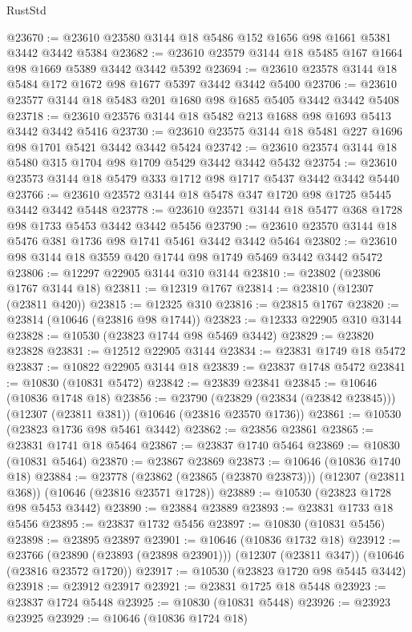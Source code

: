 \begin{lexlean}{RustStd}
\begin{coremodule}
@23670 := @23610 @23580 @3144 @18 @5486 @152 @1656 @98 @1661 @5381 @3442 @3442 @5384
@23682 := @23610 @23579 @3144 @18 @5485 @167 @1664 @98 @1669 @5389 @3442 @3442 @5392
@23694 := @23610 @23578 @3144 @18 @5484 @172 @1672 @98 @1677 @5397 @3442 @3442 @5400
@23706 := @23610 @23577 @3144 @18 @5483 @201 @1680 @98 @1685 @5405 @3442 @3442 @5408
@23718 := @23610 @23576 @3144 @18 @5482 @213 @1688 @98 @1693 @5413 @3442 @3442 @5416
@23730 := @23610 @23575 @3144 @18 @5481 @227 @1696 @98 @1701 @5421 @3442 @3442 @5424
@23742 := @23610 @23574 @3144 @18 @5480 @315 @1704 @98 @1709 @5429 @3442 @3442 @5432
@23754 := @23610 @23573 @3144 @18 @5479 @333 @1712 @98 @1717 @5437 @3442 @3442 @5440
@23766 := @23610 @23572 @3144 @18 @5478 @347 @1720 @98 @1725 @5445 @3442 @3442 @5448
@23778 := @23610 @23571 @3144 @18 @5477 @368 @1728 @98 @1733 @5453 @3442 @3442 @5456
@23790 := @23610 @23570 @3144 @18 @5476 @381 @1736 @98 @1741 @5461 @3442 @3442 @5464
@23802 := @23610 @98 @3144 @18 @3559 @420 @1744 @98 @1749 @5469 @3442 @3442 @5472
@23806 := @12297 @22905 @3144 @310 @3144
@23810 := @23802 (@23806 @1767 @3144 @18)
@23811 := @12319 @1767
@23814 := @23810 (@12307 (@23811 @420))
@23815 := @12325 @310
@23816 := @23815 @1767
@23820 := @23814 (@10646 (@23816 @98 @1744))
@23823 := @12333 @22905 @310 @3144
@23828 := @10530 (@23823 @1744 @98 @5469 @3442)
@23829 := @23820 @23828
@23831 := @12512 @22905 @3144
@23834 := @23831 @1749 @18 @5472
@23837 := @10822 @22905 @3144 @18
@23839 := @23837 @1748 @5472
@23841 := @10830 (@10831 @5472)
@23842 := @23839 @23841
@23845 := @10646 (@10836 @1748 @18)
@23856 := @23790
    (@23829 (@23834 (@23842 @23845)))
    (@12307 (@23811 @381))
    (@10646 (@23816 @23570 @1736))
@23861 := @10530 (@23823 @1736 @98 @5461 @3442)
@23862 := @23856 @23861
@23865 := @23831 @1741 @18 @5464
@23867 := @23837 @1740 @5464
@23869 := @10830 (@10831 @5464)
@23870 := @23867 @23869
@23873 := @10646 (@10836 @1740 @18)
@23884 := @23778
    (@23862 (@23865 (@23870 @23873)))
    (@12307 (@23811 @368))
    (@10646 (@23816 @23571 @1728))
@23889 := @10530 (@23823 @1728 @98 @5453 @3442)
@23890 := @23884 @23889
@23893 := @23831 @1733 @18 @5456
@23895 := @23837 @1732 @5456
@23897 := @10830 (@10831 @5456)
@23898 := @23895 @23897
@23901 := @10646 (@10836 @1732 @18)
@23912 := @23766
    (@23890 (@23893 (@23898 @23901)))
    (@12307 (@23811 @347))
    (@10646 (@23816 @23572 @1720))
@23917 := @10530 (@23823 @1720 @98 @5445 @3442)
@23918 := @23912 @23917
@23921 := @23831 @1725 @18 @5448
@23923 := @23837 @1724 @5448
@23925 := @10830 (@10831 @5448)
@23926 := @23923 @23925
@23929 := @10646 (@10836 @1724 @18)

\end{coremodule}
\end{lexlean}
